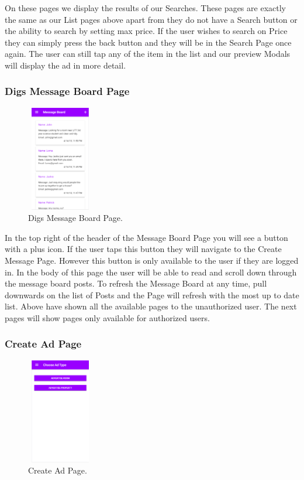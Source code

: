 On these pages we display the results of our Searches. These pages are exactly the same as our List pages above apart from they do not have a Search button or the ability to search by setting max price. If the user wishes to search on Price they can simply press the back button and they will be in the Search Page once again. The user can still tap any of the item in the list and our preview Modals will display the ad in more detail.

\subsubsection{Digs Message Board Page}

\begin{figure}[h]
\centering
\includegraphics[width=2.9cm, height=4.6cm]{img/MessageBoard}
\caption{Digs Message Board Page.}
\end{figure}

In the top right of the header of the Message Board Page you will see a button with a plus icon. If the user taps this button they will navigate to the Create Message Page. However this button is only available to the user if they are logged in. In the body of this page the user will be able to read and scroll down through the message board posts. To refresh the Message Board at any time, pull downwards on the list of Posts and the Page will refresh with the most up to date list.
Above have shown all the available pages to the unauthorized user. The next pages will show pages only available for authorized users.

\subsubsection{Create Ad Page}

\begin{figure}[h]
\centering
\includegraphics[width=2.9cm, height=4.6cm]{img/CreateAd}
\caption{Create Ad Page.}
\end{figure}

